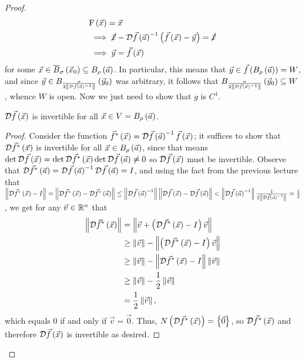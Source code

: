 \documentclass[main.tex]{subfiles}
\begin{document}
\begin{proof}
    \begin{align*}
        &\mathrm{F}\left( \vec{x} \right) = \vec{x} \\
        &\implies \cancel{\vec{x}} - \mathcal{D}\vec{f}\left( \vec{a} \right)^{-1}\left( \vec{f}\left( \vec{x} \right) - \vec{y} \right) = \cancel{\vec{x}} \\
        &\implies \vec{y} = \vec{f}\left( \vec{x} \right)
    \end{align*}
    for some $\vec{x}\in \overline{B}_\sigma\left( \vec{x}_0 \right) \subseteq B_\rho\left( \vec{a} \right)$. In particular, this means that $\vec{y}\in \vec{f}\left( B_\rho\left( \vec{a} \right) \right) = W$, and since $\vec{y}\in B_{\frac{\sigma}{2\left\lVert \mathcal{D}\vec{f}\left( \vec{a} \right)^{-1} \right\rVert}}\left( \vec{y}_0 \right)$ was arbitrary, it follows that $B_{\frac{\sigma}{2\left\lVert \mathcal{D}\vec{f}\left( \vec{a} \right)^{-1} \right\rVert}}\left( \vec{y}_0 \right) \subseteq W$, whence $W$ is open. Now we just need to show that $g$ is $C^1$.
    
    \begin{claim}
        $\mathcal{D}\vec{f}\left( \vec{x} \right)$ is invertible for all $\vec{x}\in V = B_\rho\left( \vec{a} \right)$.
    \end{claim}

    \begin{proof}
        Consider the function $\vec{f}^*\left( \vec{x} \right) = \mathcal{D}\vec{f}\left( \vec{a} \right)^{-1}\vec{f}\left( \vec{x} \right)$; it suffices to show that $\mathcal{D}\vec{f}^*\left( \vec{x} \right)$ is invertible for all $\vec{x}\in B_\rho\left( \vec{a} \right)$, since that means  $\det\mathcal{D}\vec{f}\left( \vec{x} \right) = \det \mathcal{D}\vec{f}^*\left( \vec{x} \right)\det \mathcal{D}\vec{f}\left( \vec{a} \right)\neq 0$ so $\mathcal{D}\vec{f}\left( \vec{x} \right)$ must be invertible. Observe that $\mathcal{D}\vec{f}^*\left( \vec{a} \right) = \mathcal{D}\vec{f}\left( \vec{a} \right)^{-1}\mathcal{D}\vec{f}\left( \vec{a} \right) = I$, and using the fact from the previous lecture that $\left\lVert \mathcal{D}\vec{f}^*\left( \vec{x} \right) - I \right\rVert = \left\lVert \mathcal{D}\vec{f}^*\left( \vec{x} \right) - \mathcal{D}\vec{f}^*\left( \vec{a} \right) \right\rVert \le \left\lVert \mathcal{D}\vec{f}\left( \vec{a} \right)^{-1} \right\rVert\left\lVert \mathcal{D}\vec{f}\left( \vec{x} \right) - \mathcal{D}\vec{f}\left( \vec{a} \right) \right\rVert < \left\lVert \mathcal{D}\vec{f}\left( \vec{a} \right)^{-1} \right\rVert\frac{1}{2\left\lVert \mathcal{D}\vec{f}\left( \vec{a} \right)^{-1} \right\rVert} = \frac{1}{2}$, we get for any $\vec{v}\in \mathbb R^n$ that
        \begin{align*}
            \left\lVert \mathcal{D}\vec{f}^*\left( \vec{x} \right) \right\rVert &= \left\lVert \vec{v} + \left( \mathcal{D}\vec{f}^*\left( \vec{x} \right) - I \right)\vec{v} \right\rVert \\
            &\ge \left\lVert \vec{v} \right\rVert - \left\lVert \left( \mathcal{D}\vec{f}^*\left( \vec{x} \right) - I \right)\vec{v} \right\rVert \\
            &\ge \left\lVert \vec{v} \right\rVert - \left\lVert \mathcal{D}\vec{f}^*\left( \vec{x} \right) - I \right\rVert\left\lVert \vec{v} \right\rVert \\
            &\ge \left\lVert \vec{v} \right\rVert - \frac{1}{2}\left\lVert \vec{v} \right\rVert \\
            &= \frac{1}{2}\left\lVert \vec{v} \right\rVert,
        \end{align*}
        which equals $0$ if and only if $\vec{v} = \vec{0}$. Thus, $N\left( \mathcal{D}\vec{f}^*\left( \vec{x} \right) \right) = \left\{ \vec{0} \right\}$, so $\mathcal{D}\vec{f}^*\left( \vec{x} \right)$ and therefore $\mathcal{D}\vec{f}\left( \vec{x} \right)$ is invertible as desired.
    \end{proof}


\end{proof}
\end{document}
